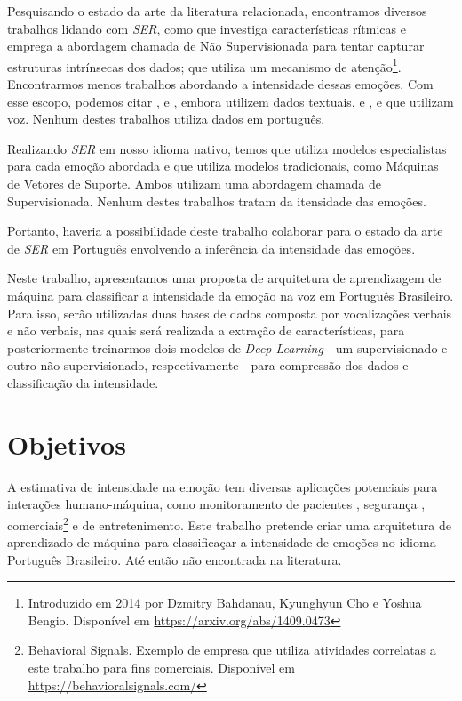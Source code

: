 Pesquisando o estado da arte da literatura relacionada, encontramos diversos trabalhos lidando com \textit{SER}, como \cite{11} que investiga características rítmicas \cite{34} e emprega a abordagem chamada de Não Supervisionada para tentar capturar estruturas intrínsecas dos dados; \cite{32.95} que utiliza um mecanismo de atenção\footnote{Introduzido em 2014 por Dzmitry Bahdanau, Kyunghyun Cho e Yoshua Bengio. Disponível em \url{https://arxiv.org/abs/1409.0473}}. Encontrarmos menos trabalhos abordando a intensidade dessas emoções. Com esse escopo, podemos citar \cite{14}, \cite{15} e \cite{28}, embora utilizem dados textuais, e \cite{3}, \cite{18} e \cite{20} que utilizam voz. Nenhum destes trabalhos utiliza dados em português.

Realizando \textit{SER} em nosso idioma nativo, temos \cite{12} que utiliza modelos especialistas para cada emoção abordada e \cite{21} que utiliza modelos tradicionais, como Máquinas de Vetores de Suporte. Ambos utilizam uma abordagem chamada de Supervisionada. Nenhum destes trabalhos tratam da itensidade das emoções.

Portanto, haveria a possibilidade deste trabalho colaborar para o estado da arte de \textit{SER} em Português envolvendo a inferência da intensidade das emoções.

Neste trabalho, apresentamos uma proposta de arquitetura de aprendizagem de máquina para classificar a intensidade da emoção na voz em Português Brasileiro. Para isso, serão utilizadas duas bases de dados composta por vocalizações verbais e não verbais, nas quais será realizada a extração de características, para posteriormente treinarmos dois modelos de \textit{Deep Learning} - um supervisionado e outro não supervisionado, respectivamente - para compressão dos dados e classificação da intensidade.

\section{Objetivos}

A estimativa de intensidade na emoção tem diversas aplicações potenciais para interações humano-máquina, como monitoramento de pacientes \cite{1}, segurança \cite{4}, comerciais\footnote{Behavioral Signals. Exemplo de empresa que utiliza atividades correlatas a este trabalho para fins comerciais. Disponível em \url{https://behavioralsignals.com/}} e de entretenimento. Este trabalho pretende criar uma arquitetura de aprendizado de máquina para classificaçar a intensidade de emoções no idioma Português Brasileiro. Até então não encontrada na literatura.

